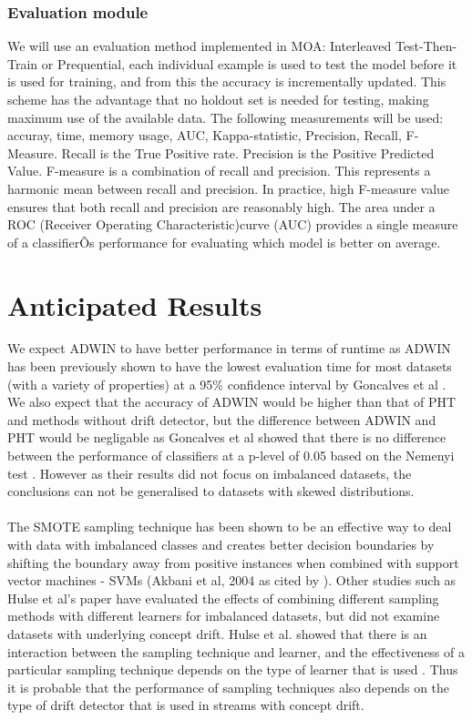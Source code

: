 \documentclass[11pt]{article}\usepackage[]{graphicx}\usepackage[]{color}
\begin{document}
\subsubsection{Evaluation module}
We will use an evaluation method implemented in MOA: Interleaved Test-Then-Train or Prequential, each individual example is used to test the model before it is used for training, and from this the accuracy is incrementally updated. This scheme has the advantage that no holdout set is needed for testing, making maximum use of the available data. 
The following measurements will be used: accuray, time, memory usage, AUC, Kappa-statistic, Precision, Recall, F-Measure. Recall is the True Positive rate. Precision is the Positive Predicted Value. F-measure is a combination of recall and precision. This represents a harmonic mean between recall and precision. In practice, high F-measure value ensures that both recall and precision are reasonably high.
The area under a ROC (Receiver Operating Characteristic)curve (AUC) provides a single measure of a classifierÕs performance for evaluating which model is better on average.

\section{Anticipated Results}

We expect ADWIN to have better performance in terms of runtime as ADWIN has been previously shown to have the lowest evaluation time for most datasets (with a variety of properties) at a 95\% confidence interval  by Goncalves et al \cite{gonc14}. We also expect that the accuracy of ADWIN would be higher than that of PHT and methods without drift detector, but the difference between ADWIN and PHT would be negligable as Goncalves et al showed that there is no difference between the performance of classifiers at a p-level of 0.05 based on the Nemenyi test \cite{gonc14}. However as their results did not focus on imbalanced datasets, the conclusions can not be generalised to datasets with skewed distributions. 
\\\\
The SMOTE sampling technique has been shown to be an effective way to deal with data with imbalanced classes \cite{SMOTE} and creates better decision boundaries by shifting the boundary away from positive instances when combined with support vector machines - SVMs (Akbani et al, 2004 as cited by \cite{neuro}). Other studies such as Hulse et al's paper \cite{hulse} have evaluated the effects of combining different sampling methods with different learners for imbalanced datasets, but did not examine datasets with underlying concept drift. Hulse et al. showed that there is an interaction between the sampling technique and learner, and the effectiveness of a particular sampling technique depends on the type of learner that is used \cite{hulse}. Thus it is probable that the performance of sampling techniques also depends on the type of drift detector that is used in streams with concept drift. 
\end{document}
